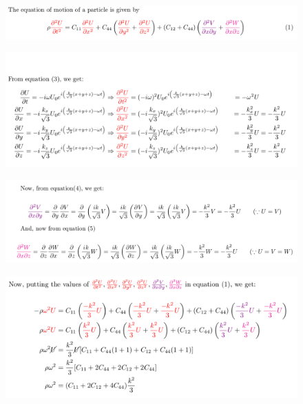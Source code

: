 \documentclass[aspectratio=43]{beamer}
\begin{document}
\begin{frame}
    \begin{figure}
        \centering
        \includegraphics[width=\linewidth]{images/5.png}
    \end{figure}
\end{frame}

\begin{frame}
       \begin{figure}
        \centering
        \includegraphics[width=\linewidth]{images/6.png}
    \end{figure}
\end{frame}

\begin{frame}
       \begin{figure}
        \centering
        \includegraphics[width=\linewidth]{images/7.png}
    \end{figure}
\end{frame}
 
 
 \begin{frame}
       \begin{figure}
        \centering
        \includegraphics[width=\linewidth]{images/8.png}
    \end{figure}
\end{frame}
\end{document}
